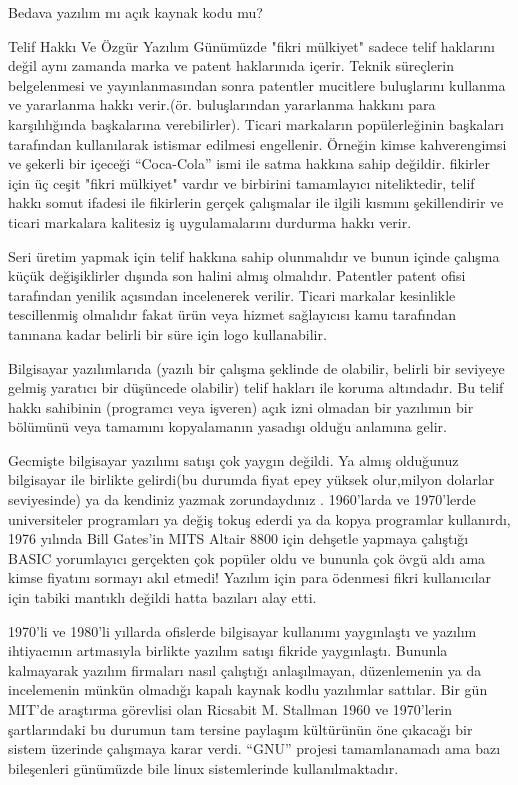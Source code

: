 \begin{section}{Bedava yazılım mı açık kaynak kodu mu?}
\begin{subsection}{Telif Hakkı Ve Özgür Yazılım}
Günümüzde "fikri mülkiyet" sadece telif haklarını değil aynı zamanda marka ve patent haklarınıda içerir. Teknik süreçlerin belgelenmesi  ve yayınlanmasından sonra patentler mucitlere buluşlarını kullanma ve yararlanma hakkı verir.(ör. buluşlarından yararlanma hakkını para karşılılığında başkalarına verebilirler). Ticari markaların popülerleğinin başkaları tarafından kullanılarak istismar edilmesi engellenir. Örneğin kimse  kahverengimsi ve şekerli bir içeceği “Coca-Cola” ismi ile satma hakkına sahip değildir. fikirler için üç ceşit "fikri mülkiyet"  vardır ve birbirini tamamlayıcı niteliktedir, telif hakkı somut ifadesi ile fikirlerin gerçek çalışmalar ile ilgili kısmını şekillendirir ve ticari markalara  kalitesiz iş uygulamalarını durdurma hakkı verir.

Seri üretim yapmak için telif hakkına sahip olunmalıdır ve bunun içinde çalışma küçük değişiklirler dışında son halini almış olmalıdır. Patentler patent ofisi tarafından yenilik açısından incelenerek verilir. Ticari markalar kesinlikle tescillenmiş olmalıdır fakat ürün veya hizmet sağlayıcısı kamu tarafından tanınana kadar belirli bir süre için logo kullanabilir.

Bilgisayar yazılımlarıda (yazılı bir çalışma şeklinde de olabilir, belirli bir seviyeye gelmiş yaratıcı bir düşüncede olabilir) telif hakları ile koruma altındadır. Bu telif hakkı sahibinin (programcı veya işveren) açık izni olmadan bir yazılımın bir bölümünü veya tamamını kopyalamanın yasadışı olduğu anlamına gelir.

Gecmişte bilgisayar yazılımı satışı çok yaygın değildi. Ya almış olduğunuz bilgisayar ile birlikte gelirdi(bu durumda fiyat epey yüksek olur,milyon dolarlar seviyesinde) ya da kendiniz yazmak zorundaydınız . 1960'larda ve 1970'lerde universiteler programları ya değiş tokuş ederdi ya da kopya programlar kullanırdı, 1976 yılında Bill Gates'in MITS Altair 8800 için dehşetle yapmaya çalıştığı BASIC yorumlayıcı gerçekten çok popüler oldu ve bununla çok övgü aldı ama kimse fiyatını sormayı akıl etmedi! Yazılım için para ödenmesi fikri kullanıcılar için tabiki mantıklı değildi hatta bazıları alay etti.

1970'li ve 1980'li yıllarda ofislerde bilgisayar kullanımı yaygınlaştı ve yazılım ihtiyacının artmasıyla birlikte yazılım satışı fikride yaygınlaştı. Bununla kalmayarak yazılım firmaları nasıl çalıştığı anlaşılmayan, düzenlemenin ya da incelemenin münkün olmadığı kapalı kaynak kodlu yazılımlar sattılar. Bir gün MIT'de araştırma görevlisi olan Ricsabit M. Stallman 1960 ve 1970'lerin şartlarındaki bu durumun tam tersine paylaşım kültürünün öne çıkacağı bir sistem üzerinde çalışmaya karar verdi. “GNU” projesi tamamlanamadı ama bazı bileşenleri günümüzde bile linux sistemlerinde kullanılmaktadır.


\end{subsection}
\end{section}
